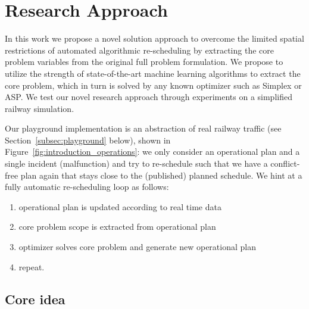 \documentclass{article}
\begin{document}




\section{Research Approach}\label{sec:researchapproach}
In this work we propose a novel solution approach to overcome the limited spatial restrictions of automated algorithmic re-scheduling by extracting the core problem variables from the original full problem formulation. We propose to utilize the strength of state-of-the-art machine learning algorithms to extract the core problem, which in turn is solved by any known optimizer such as Simplex or ASP. We test our novel research approach through experiments on a simplified railway simulation.


Our playground implementation is an abstraction of real railway traffic (see Section~\ref{subsec:playground} below), shown in Figure~\ref{fig:introduction_operations}: we only consider an operational plan and a single incident (malfunction) and try to re-schedule such that we have a conflict-free plan again that stays close to the (published) planned schedule. We hint at a fully automatic re-scheduling loop as follows:

\begin{enumerate}
    \item operational plan is updated according to real time data
    \item core problem scope is extracted from operational plan
    \item optimizer solves core problem and generate new operational plan
    \item repeat.
\end{enumerate}

\subsection{Core idea}\label{subsec:coreidea}
\end{document}
